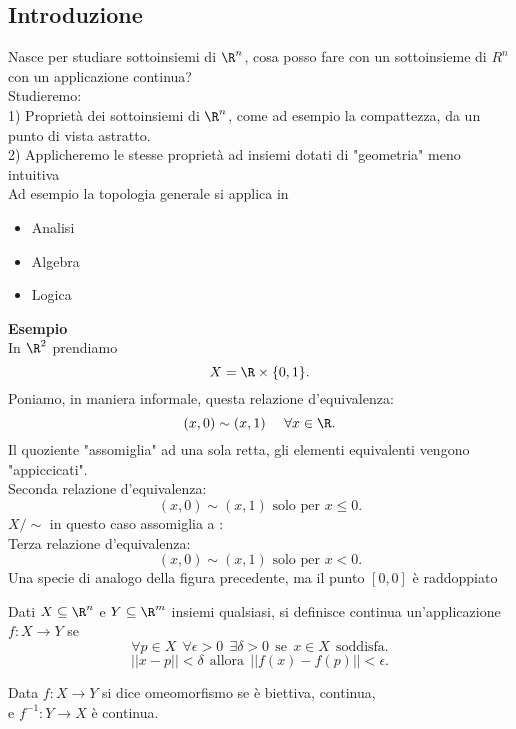 \documentclass{article}
\begin{document}
	\subsection{Introduzione}
	Nasce per studiare sottoinsiemi di $\R^n$, cosa posso fare con un sottoinsieme di  $R^n$ con un applicazione continua?\\
	Studieremo:\\
	1) Proprietà dei sottoinsiemi di $\R^n$, come ad esempio la compattezza, da un punto di vista astratto.\\
	2) Applicheremo le stesse proprietà ad insiemi dotati di "geometria" meno intuitiva\\
	Ad esempio la topologia generale si applica in 
	\begin{itemize}
		\item Analisi
		\item Algebra
		\item Logica
	\end{itemize}
	\textbf{Esempio}\\
	In $\R^2$ prendiamo \\
	 \[
		 X = \R\times\{0,1\}
	.\] 
	Poniamo, in maniera informale, questa relazione d'equivalenza:
	\[
		(x,0)\sim (x,1) \ \ \ \ \forall x\in\R
	.\] 
	Il quoziente "assomiglia" ad una sola retta, gli elementi equivalenti vengono "appiccicati".\\
Seconda relazione d'equivalenza:
\[
	(x,0)\sim(x,1) \text{   solo per   } x\leq 0
.\] 
$X/\sim$ in questo caso assomiglia a :\\
Terza relazione d'equivalenza:
\[
	(x,0)\sim (x,1) \text{    solo per    } x < 0
.\] 
Una specie di analogo della figura precedente, ma il punto $[0,0]$ è raddoppiato
\begin{defi}
	Dati $X\subseteq \R^n$ e  $Y\subseteq \R^m$ insiemi qualsiasi, si definisce continua un'applicazione  $f:X \rightarrow Y$ se 
	\[
		\forall p\in X \ \ \forall \epsilon >0\ \ \exists\delta>0\ \  \text {se} \ \ x\in X\ \  \text {soddisfa}
	.\] 
	\[
		||x-p||<\delta \ \ \text{allora} \ \ ||f(x)-f(p)||<\epsilon
	.\] 
\end{defi}
\begin{defi}[Omeomofrismo]
	Data $f: X \rightarrow Y$ si dice omeomorfismo se è biettiva, continua,\\ e $f^{-1} :Y \rightarrow X$ è continua.
\end{defi}
\end{document}
